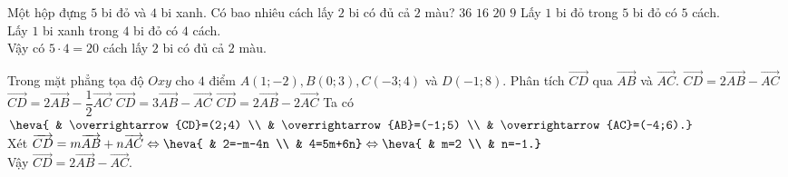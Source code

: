 \begin{ex}%
Một hộp đựng $5$ bi đỏ và $4$ bi xanh. Có bao nhiêu cách lấy $2$ bi có đủ cả $2$ màu?
\choice
{$36$}
{$16$}
{\True $20$}
{$9$}
\loigiai
{
Lấy $1$ bi đỏ trong $5$ bi đỏ có $5$ cách. \\
Lấy $1$ bi xanh trong $4$ bi đỏ có $4$ cách. \\
Vậy có $5\cdot4=20$ cách lấy $2$ bi có đủ cả $2$ màu.
}
\end{ex}

\begin{ex}%
Trong mặt phẳng tọa độ $Oxy$ cho $4$ điểm $A(1;-2), B(0;3), C(-3;4)$ và $D(-1;8)$. Phân tích $\overrightarrow{CD}$ qua $\overrightarrow{AB}$ và $\overrightarrow{AC}$.
\choice
{\True $\overrightarrow{CD}=2\overrightarrow{AB}-\overrightarrow{AC}$}
{$\overrightarrow{CD}=2\overrightarrow{AB}-\dfrac{1}{2}\overrightarrow{AC}$}
{$\overrightarrow{CD}=3\overrightarrow{AB}-\overrightarrow{AC}$}
{$\overrightarrow{CD}=2\overrightarrow{AB}-2\overrightarrow{AC}$}
\loigiai
{
Ta có $\heva{ & \overrightarrow{CD}=(2;4) \\ & \overrightarrow{AB}=(-1;5) \\ & \overrightarrow{AC}=(-4;6).}$ \\
Xét $\overrightarrow{CD}=m\overrightarrow{AB}+n\overrightarrow{AC} \Leftrightarrow \heva{ & 2=-m-4n \\ & 4=5m+6n} \Leftrightarrow \heva{ & m=2 \\ & n=-1.}$ \\
Vậy $\overrightarrow{CD}=2\overrightarrow{AB}-\overrightarrow{AC}$.
}
\end{ex}

